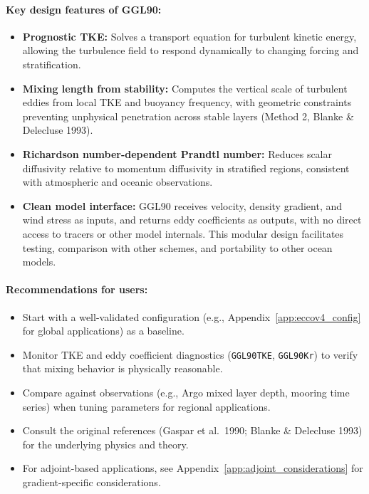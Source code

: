 \documentclass[12pt,letterpaper]{article}
\begin{document}
\paragraph{Key design features of GGL90:}
\begin{itemize}
\item \textbf{Prognostic TKE:} Solves a transport equation for turbulent kinetic energy, allowing the turbulence field to respond dynamically to changing forcing and stratification.

\item \textbf{Mixing length from stability:} Computes the vertical scale of turbulent eddies from local TKE and buoyancy frequency, with geometric constraints preventing unphysical penetration across stable layers (Method 2, Blanke \& Delecluse 1993).

\item \textbf{Richardson number-dependent Prandtl number:} Reduces scalar diffusivity relative to momentum diffusivity in stratified regions, consistent with atmospheric and oceanic observations.

\item \textbf{Clean model interface:} GGL90 receives velocity, density gradient, and wind stress as inputs, and returns eddy coefficients as outputs, with no direct access to tracers or other model internals. This modular design facilitates testing, comparison with other schemes, and portability to other ocean models.
\end{itemize}

\paragraph{Recommendations for users:}
\begin{itemize}
\item Start with a well-validated configuration (e.g., Appendix~\ref{app:eccov4_config} for global applications) as a baseline.
\item Monitor TKE and eddy coefficient diagnostics (\verb|GGL90TKE|, \verb|GGL90Kr|) to verify that mixing behavior is physically reasonable.
\item Compare against observations (e.g., Argo mixed layer depth, mooring time series) when tuning parameters for regional applications.
\item Consult the original references (Gaspar et al.\ 1990; Blanke \& Delecluse 1993) for the underlying physics and theory.
\item For adjoint-based applications, see Appendix~\ref{app:adjoint_considerations} for gradient-specific considerations.
\end{itemize}
\end{document}
